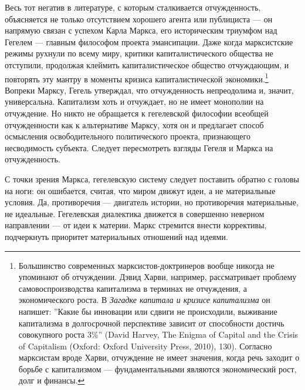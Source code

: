\documentclass[12pt]{book}
\begin{document}
Весь тот негатив в литературе, с которым сталкивается отчужденность, объясняется не только отсутствием хорошего агента или публициста --- он напрямую связан с успехом Карла Маркса, его историческим триумфом над Гегелем --- главным философом проекта эмансипации. Даже когда марксистские режимы рухнули по всему миру, критики капиталистического общества не отступили, продолжая клеймить капиталистическое общество отчуждающим, и повторять эту мантру в моменты кризиса капиталистической экономики.\footnote{Большинство современных марксистов-доктринеров вообще никогда не упоминают об отчуждении. Дэвид Харви, например, рассматривает проблему самовоспроизводства капитализма в терминах не отчуждения, а экономического роста. В \textit{Загадке капитала и кризисе капитализма} он напишет: ''Какие бы инновации или сдвиги не происходили, выживание капитализма в долгосрочной перспективе зависит от способности достичь совокупного роста 3\%'' (David Harvey, The Enigma of Capital and the Crisis of Capitalism (Oxford: Oxford University Press, 2010), 130). Согласно марксистам вроде Харви, отчуждение не имеет значения, когда речь заходит о борьбе с капитализмом --- фундаментальными являются экономический рост, долг и финансы.} Вопреки Марксу, Гегель утверждал, что отчужденность непреодолима и, значит, универсальна. Капитализм хоть и отчуждает, но не имеет монополии на отчуждение. Но никто не обращается к гегелевской философии всеобщей отчужденности как к альтернативе Марксу, хотя он и предлагает способ осмысления освободительного политического проекта, признающего несводимость субъекта. Следует пересмотреть взгляды Гегеля и Маркса на отчужденность.

С точки зрения Маркса, гегелевскую систему следует поставить обратно с головы на ноги: он ошибается, считая, что миром движут идеи, а не материальные условия. Да, противоречия --- двигатель истории, но противоречия материальные, не идеальные. Гегелевская диалектика движется в совершенно неверном направлении --- от идеи к материи. Маркс стремится внести коррективы, подчеркнуть приоритет материальных отношений над идеями.
\end{document}
